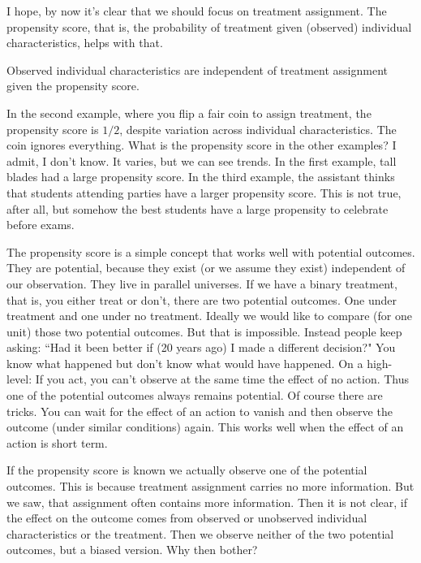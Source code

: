 I hope, by now it's clear that 
we should focus on treatment assignment.
The propensity score\cite{Rosenbaum1983}, that is,
the probability of treatment given (observed) individual characteristics,
helps with that.
\begin{theorem*}
  \emph{\cite[Theorem~1]{Rosenbaum1983}}
Observed individual characteristics are independent 
of treatment assignment given the propensity score.
\end{theorem*}



In the second example, where you flip a fair coin to assign treatment, the propensity score is $1/2$, despite variation across individual characteristics.
The coin ignores everything.
What is the propensity score in the other examples?
I admit, I don't know.
It varies, but we can see trends. 
In the first example, tall blades had a large propensity score.
In the third example, the assistant thinks that students attending parties have a larger propensity score. This is not true, after all, but somehow the best students have a large propensity to celebrate before exams. 

The propensity score is a simple concept that works well with potential outcomes.
They are potential, because they exist (or we assume they exist) independent of our observation. They live in parallel universes.
If we have a binary treatment, that is, you either treat or don't, there are two potential outcomes. One under treatment and one under no treatment.
Ideally we would like to compare (for one unit) those two potential outcomes.
But that is impossible. 
Instead people keep asking:
“Had it been better if (20 years ago) I made a different decision?"
You know what happened but don't know what would have happened.
On a high-level: If you act, you can't observe at the same time the effect of no action.
Thus one of the potential outcomes always remains potential.
Of course there are tricks. You can  wait for the effect of an action to vanish and then observe the outcome (under similar conditions) again.
This works well when the effect of an action is short term.

If the propensity score is known we actually observe one of the potential outcomes.
This is because treatment assignment carries no more information.
But we saw, that assignment often contains more information.
Then it is not clear, if the effect on the outcome comes from observed or unobserved individual characteristics or the treatment.
Then we observe neither of the two potential outcomes, but a biased version.
Why then bother?

